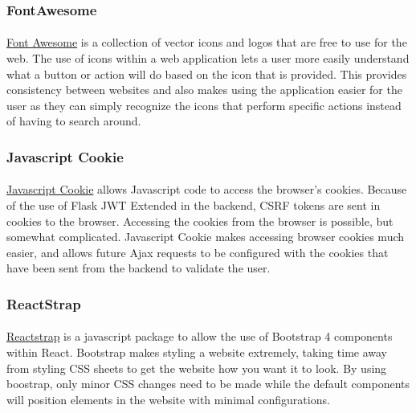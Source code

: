 \documentclass[12pt]{article}
\begin{document}
\subsubsection{FontAwesome}	
\paragraph{}
	\href{https://fontawesome.com/}{Font Awesome} is a collection of vector icons and logos that are free to use for the web. The use of icons within a web application lets a user more easily understand what a button or action will do based on the icon that is provided. This provides consistency between websites and also makes using the application easier for the user as they can simply recognize the icons that perform specific actions instead of having to search around.
	
\subsubsection{Javascript Cookie}	
\paragraph{}
	\href{https://github.com/js-cookie/js-cookie}{Javascript Cookie} allows Javascript code to access the browser's cookies. Because of the use of Flask JWT Extended in the backend, CSRF tokens are sent in cookies to the browser. Accessing the cookies from the browser is possible, but somewhat complicated. Javascript Cookie makes accessing browser cookies much easier, and allows future Ajax requests to be configured with the cookies that have been sent from the backend to validate the user.
	
\subsubsection{ReactStrap}	
\paragraph{}
	\href{https://reactstrap.github.io/}{Reactstrap} is a javascript package to allow the use of Bootstrap 4 components within React. Bootstrap makes styling a website extremely, taking time away from styling CSS sheets to get the website how you want it to look. By using boostrap, only minor CSS changes need to be made while the default components will position elements in the website with minimal configurations.
	
	
\end{document}
